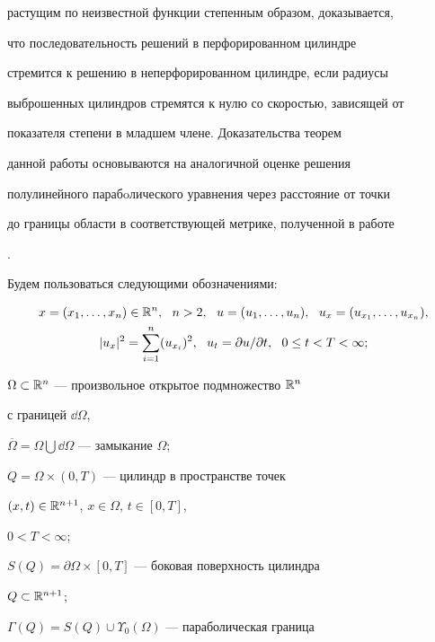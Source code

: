 растущим по неизвестной функции степенным образом, доказывается,


что последовательность решений в перфорированном цилиндре


стремится к решению в неперфорированном цилиндре, если радиусы


выброшенных цилиндров стремятся к нулю со скоростью, зависящей от


показателя степени в младшем члене. Доказательства теорем


данной работы основываются на аналогичной оценке решения


полулинейного парабoлического уравнения через расстояние от точки


до границы области в соответствующей метрике, полученной в работе


\cite{Ch}.





Будем пользоваться следующими обозначениями:


\begin{gather*}


x=(x_1,\dotsc,x_n)\in\Bbb{R}^{n},\ \ n>2,\ \ u=(u_1,\dotsc,u_n),


\ \ u_x=(u_{x_1},\dotsc,u_{x_n}),\\


|u_x|^2=\sum\limits_{i=1}^n(u_{x_i})^2,


\ \ u_t=\dd u/\dd t, \ \ 0\leq t<T<\infty;


\end{gather*}





$\Omega \subset \Bbb R^n$ --- произвольное открытое подмножество $\Bbb R^n$


с границей $\dd\Omega$,


$\overline\Omega=\Omega\bigcup\dd\Omega$ --- замыкание $\Omega$;


$Q= \Omega\times(0,T)$ --- цилиндр в пространстве точек


$(x,t)\in\Bbb{R}^{n+1}$, $x\in\Omega$, $t\in[0,T]$,


$0<T<\infty$;





$S(Q)=\partial\Omega\times[0,T]$ --- боковая поверхность цилиндра


$Q\subset\Bbb{R}^{n+1}$;


$\Gamma(Q)=S(Q)\cup\Upsilon_0(\Omega)$ --- параболическая граница


